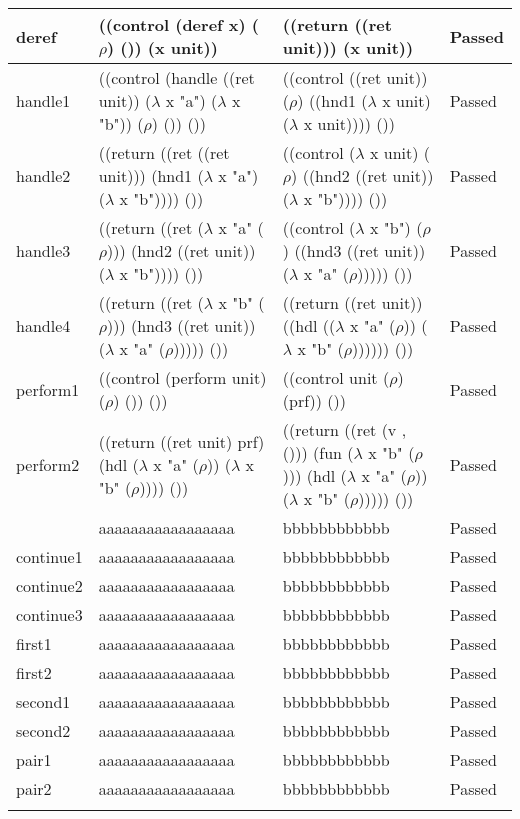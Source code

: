 \documentclass[12pt,a4paper,twoside,openright]{report}
\begin{document}
\begin{longtable}{| p{2.5cm} | p{5.5cm} |  p{5.5cm} | p{1.5cm} |}
deref & ((control (deref x) ($\rho$) ()) (x unit)) & ((return ((ret unit))) (x unit)) & Passed \\ \hline
handle1 & ((control (handle ((ret unit)) ($\lambda$ x "a") ($\lambda$ x "b")) ($\rho$) ()) ())  & ((control ((ret unit)) ($\rho$) ((hnd1 ($\lambda$ x unit) ($\lambda$ x unit)))) ()) & Passed \\ \hline
handle2 & ((return ((ret ((ret unit))) (hnd1 ($\lambda$ x "a") ($\lambda$ x "b")))) ()) & ((control ($\lambda$ x unit) ($\rho$) ((hnd2 ((ret unit)) ($\lambda$ x "b")))) ()) & Passed \\ \hline
handle3 & ((return ((ret ($\lambda$ x "a" ($\rho$))) (hnd2 ((ret unit)) ($\lambda$ x "b")))) ()) & ((control ($\lambda$ x "b") ($\rho$) ((hnd3 ((ret unit)) ($\lambda$ x "a" ($\rho$))))) ()) & Passed \\ \hline
handle4 & ((return ((ret ($\lambda$ x "b" ($\rho$))) (hnd3 ((ret unit)) ($\lambda$ x "a" ($\rho$))))) ()) & ((return ((ret unit)) ((hdl (($\lambda$ x "a" ($\rho$)) ($\lambda$ x "b" ($\rho$)))))) ()) & Passed \\ \hline
perform1 & ((control (perform unit) ($\rho$) ()) ()) & ((control unit ($\rho$) (prf)) ()) & Passed \\ \hline
perform2 & ((return ((ret unit) prf) (hdl ($\lambda$ x "a" ($\rho$)) ($\lambda$ x "b" ($\rho$)))) ()) & ((return ((ret (v , ())) (fun ($\lambda$ x "b" ($\rho$))) (hdl ($\lambda$ x "a" ($\rho$)) ($\lambda$ x "b" ($\rho$))))) ()) & Passed \\ \hline
\begin{comment}
effHalt & aaaaaaaaaaaaaaaaa & bbbbbbbbbbbb & Passed \\ \hline
continue1 & aaaaaaaaaaaaaaaaa & bbbbbbbbbbbb & Passed \\ \hline
continue2 & aaaaaaaaaaaaaaaaa & bbbbbbbbbbbb & Passed \\ \hline
continue3 & aaaaaaaaaaaaaaaaa & bbbbbbbbbbbb & Passed \\ \hline
first1 & aaaaaaaaaaaaaaaaa & bbbbbbbbbbbb & Passed \\ \hline
first2 & aaaaaaaaaaaaaaaaa & bbbbbbbbbbbb & Passed \\ \hline
second1 & aaaaaaaaaaaaaaaaa & bbbbbbbbbbbb & Passed \\ \hline
second2 & aaaaaaaaaaaaaaaaa & bbbbbbbbbbbb & Passed \\ \hline
pair1 & aaaaaaaaaaaaaaaaa & bbbbbbbbbbbb & Passed \\ \hline
pair2 & aaaaaaaaaaaaaaaaa & bbbbbbbbbbbb & Passed \\ \hline

\end{comment}
\end{longtable}
\end{document}

